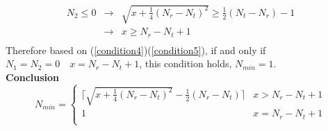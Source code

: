 \documentclass[12pt,a4paper,final]{article}
\begin{document}
\begin{spacing}{2.5}
\begin{eqnarray}
\end{eqnarray}
\begin{eqnarray}
\nonumber
N_{2}\leq 0&\rightarrow & \sqrt{x+\frac{1}{4}(N_{r}-N_{t})^{2}}\geq \frac{1}{2}(N_{t}-N_{r})-1\\
\nonumber
&\rightarrow &x\geq N_{r}-N_{t}+1\\ \label{condition5}
\end{eqnarray}
Therefore based on (\ref{condition4})(\ref{condition5}), if and only if $N_{1}=N_{2}=0\quad x=N_{r}-N_{t}+1$, this condition holds, $N_{min}=1$.\\
\textbf{Conclusion}\\
\begin{displaymath}
N_{min}=\left\{\begin{array}{ll}
\lceil \sqrt{x+\frac{1}{4}(N_{r}-N_{t})^2}-\frac{1}{2}(N_{r}-N_{t}) \rceil & x>N_{r}-N_{t}+1\\
1 & x= N_{r}-N_{t}+1\\
\end{array}\right.
\end{displaymath}\\

\end{spacing}
\end{document}
